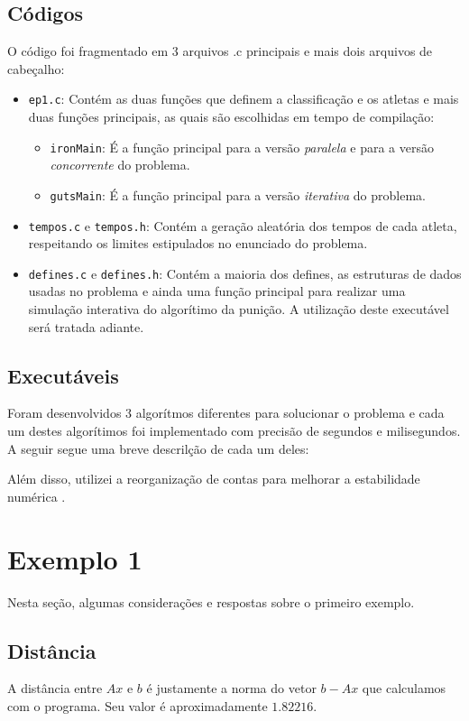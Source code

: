 \documentclass[12pt,a4paper]{article}
\begin{document}
\subsection{Códigos}
O código foi fragmentado em 3 arquivos .c principais e mais dois arquivos de cabeçalho:

\begin{itemize}
\item \verb+ep1.c+: Contém as duas funções que definem a classificação e os atletas e mais duas funções principais, as quais são escolhidas em tempo de compilação:
\begin{itemize}
\item \verb+ironMain+: É a função principal para a versão \textit{paralela} e para a versão \textit{concorrente} do problema.
\item \verb+gutsMain+: É a função principal para a versão \textit{iterativa} do problema.
\end{itemize}
\item \verb+tempos.c+ e \verb+tempos.h+: Contém a geração aleatória dos tempos de cada atleta, respeitando os limites estipulados no enunciado do problema.
\item \verb+defines.c+ e \verb+defines.h+:  Contém a maioria dos defines, as estruturas de dados usadas no problema e ainda uma função principal para realizar uma simulação interativa do algorítimo da punição. A utilização deste executável será tratada adiante.
\end{itemize}

\subsection{Executáveis}

Foram desenvolvidos 3 algorítmos diferentes para solucionar o problema e cada um destes algorítimos foi implementado com precisão de segundos e milisegundos. A seguir segue uma breve descrilção de cada um deles: 


Além disso, utilizei a reorganização de contas para melhorar a estabilidade numérica \cite{GSM}.

\section{Exemplo 1}
Nesta seção, algumas considerações e respostas sobre o primeiro exemplo.
\subsection{Distância}
A distância entre $Ax$ e $b$ é justamente a norma do vetor $b-Ax$ que calculamos com o programa.
Seu valor é aproximadamente $1.82216$.
\end{document}
